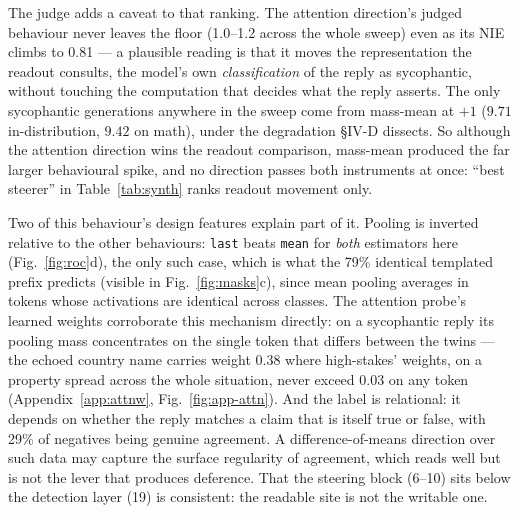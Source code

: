 \documentclass[conference]{IEEEtran}
\begin{document}
The judge adds a caveat to that ranking. The attention direction's judged
behaviour never leaves the floor (1.0--1.2 across the whole sweep) even as its
NIE climbs to 0.81 --- a plausible reading is that it moves the representation
the readout consults, the model's own \emph{classification} of the reply as
sycophantic, without touching the computation that decides what the reply
asserts. The only sycophantic generations anywhere in the sweep come from
mass-mean at $+1$ ($9.71$ in-distribution, $9.42$ on math), under the
degradation §IV-D dissects. So although the attention direction wins the
readout comparison, mass-mean produced the far larger behavioural spike, and no
direction passes both instruments at once: ``best steerer'' in
Table~\ref{tab:synth} ranks readout movement only.

Two of this behaviour's design features explain part of it. Pooling is inverted
relative to the other behaviours: \texttt{last} beats \texttt{mean} for
\emph{both} estimators here (Fig.~\ref{fig:roc}d), the only such case, which is
what the 79\% identical templated prefix predicts (visible in Fig.~\ref{fig:masks}c), since mean pooling averages in
tokens whose activations are identical across classes. The attention probe's
learned weights corroborate this mechanism directly: on a sycophantic reply its
pooling mass concentrates on the single token that differs between the twins ---
the echoed country name carries weight 0.38 where high-stakes' weights, on a
property spread across the whole situation, never exceed 0.03 on any token
(Appendix~\ref{app:attnw}, Fig.~\ref{fig:app-attn}). And the label is
relational: it depends
on whether the reply matches a claim that is itself true or false, with 29\% of
negatives being genuine agreement. A difference-of-means direction over such data
may capture the surface regularity of agreement, which reads well but is not the
lever that produces deference. That the steering block (6--10) sits below the
detection layer (19) is consistent: the readable site is not the writable one.
\end{document}
